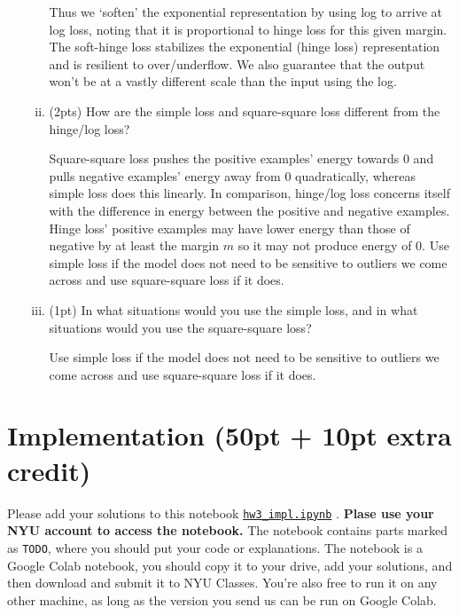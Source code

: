 \documentclass{article}
\begin{document}
\begin{enumerate}[(a)]
\begin{enumerate}[(i)]
\begin{tcolorbox}
                 Thus we `soften' the exponential representation by using log to arrive at log loss, noting that it
                 is proportional to hinge loss for this given margin. The soft-hinge loss stabilizes the exponential (hinge loss) 
                 representation and is resilient to over/underflow. We also guarantee that the 
                 output won't be at a vastly different scale than the input using the log.
            \end{tcolorbox}
    \item (2pts) How are the simple loss and square-square loss different from the hinge/log loss?
    \begin{tcolorbox}
        Square-square loss pushes the positive examples' energy
        towards 0 and pulls negative examples' energy away from 0 quadratically,
        whereas simple loss does this linearly. In comparison, hinge/log loss concerns
        itself with the difference in energy between the positive and negative
        examples. Hinge loss' positive examples may have lower energy than those of negative by at
        least the margin $m$ so it may not produce energy of 0. Use
        simple loss if the model does not need to be sensitive to outliers we come
        across and use square-square loss if it does.
    \end{tcolorbox}
    \item (1pt) In what situations would you use the simple loss, and in what situations would you use the square-square loss?
    \begin{tcolorbox}
        Use simple loss if the model does not need to be sensitive to outliers we come across and use square-square loss if it does.
    \end{tcolorbox}
\end{enumerate}


\end{enumerate}


\section{Implementation (50pt + 10pt extra credit)}

Please add your solutions to this notebook
\href{https://drive.google.com/file/d/1zDjkA0R8puzTkJsJqGLjqYhLfYLJtAMT/view?usp=sharing}{\texttt{hw3\_impl.ipynb}}
.
\textbf{Plase use your NYU account to access the notebook.} The notebook contains parts marked as \texttt{TODO}, where you should put your code or explanations. The notebook is a Google Colab notebook, you should copy it to your drive, add your solutions, and then download and submit it to NYU Classes. You're also free to run it on any other machine, as long as the version you send us can be run on Google Colab.
\end{document}
